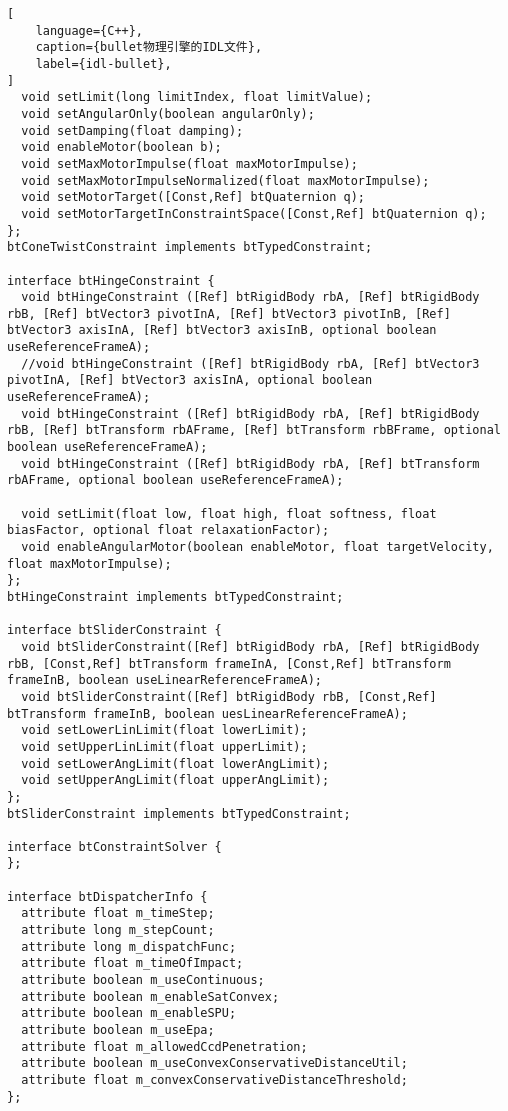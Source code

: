 \begin{lstlisting}[
    language={C++},
    caption={bullet物理引擎的IDL文件},
    label={idl-bullet},
]
  void setLimit(long limitIndex, float limitValue);
  void setAngularOnly(boolean angularOnly);
  void setDamping(float damping);
  void enableMotor(boolean b);
  void setMaxMotorImpulse(float maxMotorImpulse);
  void setMaxMotorImpulseNormalized(float maxMotorImpulse);
  void setMotorTarget([Const,Ref] btQuaternion q);
  void setMotorTargetInConstraintSpace([Const,Ref] btQuaternion q);
};
btConeTwistConstraint implements btTypedConstraint;

interface btHingeConstraint {
  void btHingeConstraint ([Ref] btRigidBody rbA, [Ref] btRigidBody rbB, [Ref] btVector3 pivotInA, [Ref] btVector3 pivotInB, [Ref] btVector3 axisInA, [Ref] btVector3 axisInB, optional boolean useReferenceFrameA);
  //void btHingeConstraint ([Ref] btRigidBody rbA, [Ref] btVector3 pivotInA, [Ref] btVector3 axisInA, optional boolean useReferenceFrameA);
  void btHingeConstraint ([Ref] btRigidBody rbA, [Ref] btRigidBody rbB, [Ref] btTransform rbAFrame, [Ref] btTransform rbBFrame, optional boolean useReferenceFrameA);
  void btHingeConstraint ([Ref] btRigidBody rbA, [Ref] btTransform rbAFrame, optional boolean useReferenceFrameA);

  void setLimit(float low, float high, float softness, float biasFactor, optional float relaxationFactor);
  void enableAngularMotor(boolean enableMotor, float targetVelocity, float maxMotorImpulse);
};
btHingeConstraint implements btTypedConstraint;

interface btSliderConstraint {
  void btSliderConstraint([Ref] btRigidBody rbA, [Ref] btRigidBody rbB, [Const,Ref] btTransform frameInA, [Const,Ref] btTransform frameInB, boolean useLinearReferenceFrameA);
  void btSliderConstraint([Ref] btRigidBody rbB, [Const,Ref] btTransform frameInB, boolean uesLinearReferenceFrameA);
  void setLowerLinLimit(float lowerLimit);
  void setUpperLinLimit(float upperLimit);
  void setLowerAngLimit(float lowerAngLimit);
  void setUpperAngLimit(float upperAngLimit);
};
btSliderConstraint implements btTypedConstraint;

interface btConstraintSolver {
};

interface btDispatcherInfo {
  attribute float m_timeStep;
  attribute long m_stepCount;
  attribute long m_dispatchFunc;
  attribute float m_timeOfImpact;
  attribute boolean m_useContinuous;
  attribute boolean m_enableSatConvex;
  attribute boolean m_enableSPU;
  attribute boolean m_useEpa;
  attribute float m_allowedCcdPenetration;
  attribute boolean m_useConvexConservativeDistanceUtil;
  attribute float m_convexConservativeDistanceThreshold;
};


\end{lstlisting}
